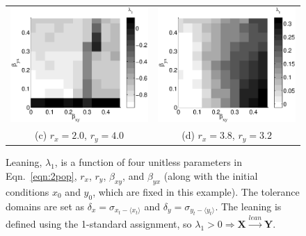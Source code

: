 \documentclass[twocolumn,aps,pre,groupedaddress]{revtex4-1}
\begin{document}
\begin{figure}[ht]
\begin{tabular}{cc}
\includegraphics[scale=0.30]{CoupLogexample_rx20ry40.eps} &
\includegraphics[scale=0.30]{CoupLogexample_rx38ry32.eps} \\
(c) $r_x = 2.0$, $r_y = 4.0$ & (d) $r_x = 3.8$, $r_y = 3.2$ \\
\end{tabular}
\caption{Leaning, $\lambda_1$, is a function of four unitless parameters in Eqn.\ \ref{eqn:2pop}, $r_x$, $r_y$, $\beta_{xy}$, and $\beta_{yx}$ (along with the initial conditions $x_0$ and $y_0$, which are fixed in this example).  The tolerance domains are set as $\delta_x = \sigma_{x_t-\langle x_t \rangle}$ and $\delta_y = \sigma_{y_t-\langle y_t \rangle}$.  The leaning is defined using the 1-standard assignment, so $\lambda_1>0\Rightarrow\mathbf{X}\xrightarrow{lean}\mathbf{Y}$.}
\label{fig:2pop}
\end{figure}
\end{document}
